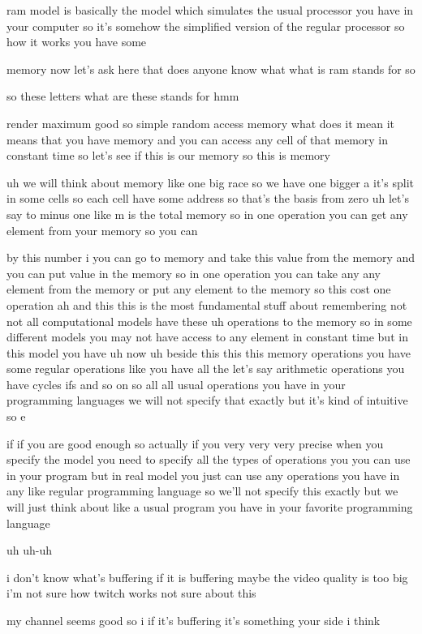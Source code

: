 ram model is basically the model which simulates the usual processor you have in your computer so it's somehow the simplified version of the regular processor so how it works you have some

memory now let's ask here that does anyone know what what is ram stands for so

so these letters what are these stands for hmm

render maximum good so simple random access memory what does it mean it means that you have memory and you can access any cell of that memory in constant time so let's see if this is our memory so this is memory

uh we will think about memory like one big race so we have one bigger a it's split in some cells so each cell have some address so that's the basis from zero uh let's say to minus one like m is the total memory so in one operation you can get any element from your memory so you can

by this number i you can go to memory and take this value from the memory and you can put value in the memory so in one operation you can take any any element from the memory or put any element to the memory so this cost one operation ah and this this is the most fundamental stuff about remembering not not all computational models have these uh operations to the memory so in some different models you may not have access to any element in constant time but in this model you have uh now uh beside this this this memory operations you have some regular operations like you have all the let's say arithmetic operations you have cycles ifs and so on so all all usual operations you have in your programming languages we will not specify that exactly but it's kind of intuitive so e

if if you are good enough so actually if you very very very precise when you specify the model you need to specify all the types of operations you you can use in your program but in real model you just can use any operations you have in any like regular programming language so we'll not specify this exactly but we will just think about like a usual program you have in your favorite programming language

uh uh-uh

i don't know what's buffering if it is buffering maybe the video quality is too big i'm not sure how twitch works not sure about this

my channel seems good so i if it's buffering it's something your side i think

